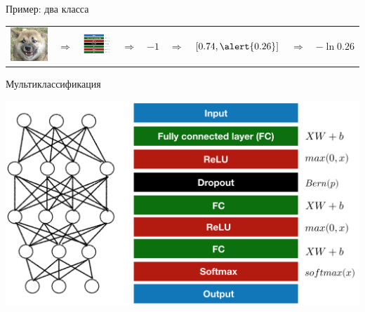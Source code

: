 \documentclass[notes,12pt, aspectratio=169]{beamer}
\begin{document}
\begin{frame}{Пример: два класса}
\begin{tabular}{m{2.5cm} m{0.35cm} m{1.8cm} m{0.35cm} m{0.5cm} m{0.35cm} m{2cm}  m{0.5cm} m{3.2cm}}
	\includegraphics[scale=0.2]{tab_dog.png}&  {\Large $\Rightarrow$} &  \includegraphics[scale=0.2]{tab_nn.png}  &  {\Large $\Rightarrow$}  &  $-1$ &  {\Large $\Rightarrow$}  &   $[0.74, \alert{0.26}]$ & {\Large $\Rightarrow$}  &  $-\ln 0.26$\\
\end{tabular}
\end{frame}


\begin{frame}{Мультиклассификация}
\begin{center}
	\includegraphics[width=0.75\paperwidth]{lego_nn_multi.png}
\end{center}
\end{frame}
\end{document}
